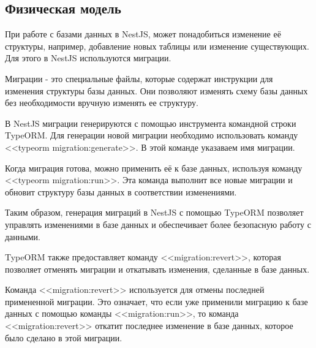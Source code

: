 \subsection*{Физическая модель}

При работе с базами данных в NestJS, может понадобиться изменение её структуры, например, добавление новых таблицы или изменение существующих.
Для этого в NestJS используются миграции.

Миграции - это специальные файлы, которые содержат инструкции для изменения структуры базы данных.
Они позволяют изменять схему базы данных без необходимости вручную изменять ее структуру.

В NestJS миграции генерируются с помощью инструмента командной строки TypeORM.
Для генерации новой миграции необходимо использовать команду <<typeorm migration:generate>>.
В этой команде указаваем имя миграции.

Когда миграция готова, можно применить её к базе данных, используя команду <<typeorm migration:run>>.
Эта команда выполнит все новые миграции и обновит структуру базы данных в соответствии изменениями.

Таким образом, генерация миграций в NestJS с помощью TypeORM позволяет управлять изменениями в базе данных и обеспечивает более безопасную работу с данными.

TypeORM также предоставляет команду <<migration:revert>>, которая позволяет отменять миграции и откатывать изменения, сделанные в базе данных.

Команда <<migration:revert>> используется для отмены последней примененной миграции.
Это означает, что если уже применили миграцию к базе данных с помощью команды <<migration:run>>,
то команда <<migration:revert>> откатит последнее изменение в базе данных, которое было сделано в этой миграции.
